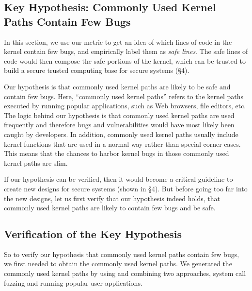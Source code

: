 \subsection{Key Hypothesis: Commonly Used Kernel Paths Contain Few Bugs}
In this section, we use our metric to get an idea of which lines of code in the kernel contain few bugs, and empirically label 
them as \textit{safe lines}. The safe lines of code would then compose the safe portions of the kernel, which can 
be trusted to build a secure trusted computing base for secure systems (\S{4}). 

Our hypothesis is that commonly used kernel paths are likely to be safe and contain few bugs. 
Here, ``commonly used kernel paths'' refers to the kernel paths executed by running popular 
applications, such as Web browsers, file editors, etc. 
The logic behind our hypothesis is that commonly used kernel paths are used
frequently and therefore bugs and vulnerabilities would have most likely
been caught by developers.  In addition, commonly used kernel paths usually 
include kernel functions that are used in a normal way rather than special 
corner cases. This means that the chances 
to harbor kernel bugs in those commonly used kernel paths are slim. 

If our hypothesis can be verified, then it would become a critical guideline to create new designs for secure systems 
(shown in \S{4}). 
But before going too far into the new designs, let us first verify that our hypothesis indeed holds, that 
commonly used kernel paths are likely to contain few bugs and be safe. 

\subsection{Verification of the Key Hypothesis}
So to verify our hypothesis that commonly used kernel paths contain few bugs, we 
first needed to obtain the commonly used kernel paths. 
We generated the commonly used kernel paths by using and combining two approaches, 
system call fuzzing and running popular user applications.  

